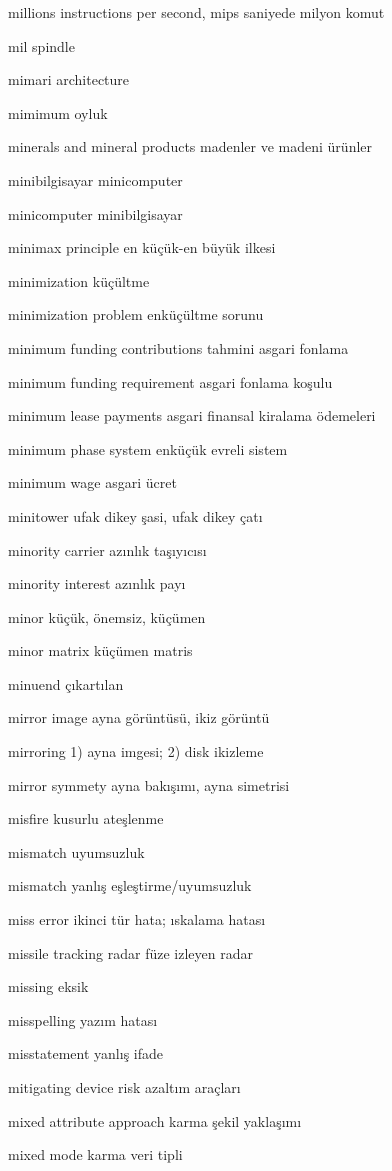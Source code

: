 \documentclass[12pt,fleqn]{article}\usepackage{../../common}
\begin{document}
millions instructions per second, mips saniyede milyon komut

mil spindle

mimari architecture

mimimum oyluk

minerals and mineral products madenler ve madeni ürünler

minibilgisayar minicomputer

minicomputer minibilgisayar

minimax principle en küçük-en büyük ilkesi

minimization küçültme

minimization problem enküçültme sorunu

minimum funding contributions tahmini asgari fonlama

minimum funding requirement asgari fonlama koşulu

minimum lease payments asgari finansal kiralama ödemeleri

minimum phase system enküçük evreli sistem

minimum wage asgari ücret

minitower ufak dikey şasi, ufak dikey çatı

minority carrier azınlık taşıyıcısı

minority interest azınlık payı

minor küçük, önemsiz, küçümen

minor matrix küçümen matris

minuend çıkartılan

mirror image ayna görüntüsü, ikiz görüntü

mirroring 1) ayna imgesi; 2) disk ikizleme

mirror symmety ayna bakışımı, ayna simetrisi

misfire kusurlu ateşlenme

mismatch uyumsuzluk

mismatch yanlış eşleştirme/uyumsuzluk

miss error ikinci tür hata; ıskalama hatası

missile tracking radar füze izleyen radar

missing eksik

misspelling yazım hatası

misstatement yanlış ifade

mitigating device risk azaltım araçları

mixed attribute approach karma şekil yaklaşımı

mixed mode karma veri tipli
\end{document}

